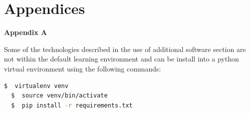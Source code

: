 \documentclass[10pt, a4paper]{article}
\newcommand{\figuremacro}[5]{
    \begin{figure}[#1]
        \centering
        \texttt{[image: \#2]}
        \caption[#3]{\textbf{#3}#4}
        \label{fig:#2}
    \end{figure}
}
\begin{document}

\noindent




\clearpage
\section*{Appendices}	
\textbf{Appendix A}
	        

Some of the technologies described in the use of additional software section are not within the default learning environment and can be install into a python virtual environment using the following commands:

\begin{lstlisting}[language=sh]
  $  virtualenv venv
  $  source venv/bin/activate
  $  pip install -r requirements.txt
\end{lstlisting}


		
\end{document}
